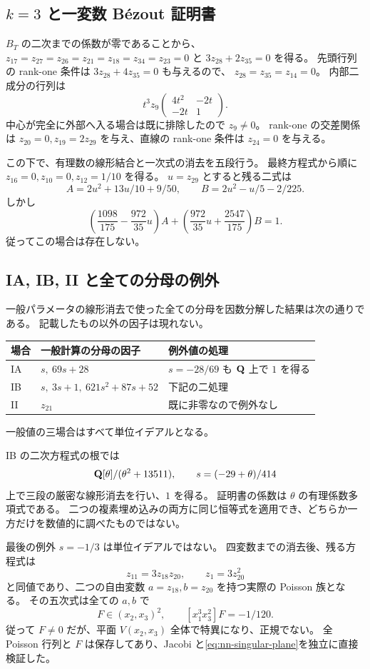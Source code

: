 \documentclass[11pt,a4paper]{ltjsarticle}
\theoremstyle{remark}\newtheorem{remark}[theorem]{注意}
\begin{document}
\subsection{\texorpdfstring{$k=3$}{k=3} と一変数 B\'ezout 証明書}
$B_T$ の二次までの係数が零であることから、
$z_{17}=z_{27}=z_{26}=z_{21}=z_{18}=z_{34}=z_{23}=0$ と $3z_{28}+2z_{35}=0$ を得る。
先頭行列の rank-one 条件は $3z_{28}+4z_{35}=0$ も与えるので、
$z_{28}=z_{35}=z_{14}=0$。
内部二成分の行列は
\[
 t^3z_9\begin{pmatrix}4t^2&-2t\\-2t&1\end{pmatrix}.
\]
中心が完全に外部へ入る場合は既に排除したので $z_9\ne0$。
rank-one の交差関係は $z_{20}=0,z_{19}=2z_{29}$ を与え、直線の rank-one 条件は
$z_{24}=0$ を与える。

この下で、有理数の線形結合と一次式の消去を五段行う。
最終方程式から順に $z_{16}=0,z_{10}=0,z_{12}=1/10$ を得る。
$u=z_{29}$ とすると残る二式は
\[
 A=2u^2+13u/10+9/50,\qquad
 B=2u^2-u/5-2/225.
\]
しかし
\[
 \left(\frac{1098}{175}-\frac{972}{35}u\right)A+
 \left(\frac{972}{35}u+\frac{2547}{175}\right)B=1.
\]
従ってこの場合は存在しない。

\subsection{IA, IB, II と全ての分母の例外}
一般パラメータの線形消去で使った全ての分母を因数分解した結果は次の通りである。
記載したもの以外の因子は現れない。

\begin{center}\small
\begin{tabular}{@{}lll@{}}\toprule
場合 & 一般計算の分母の因子 & 例外値の処理\\\midrule
IA & $s,\ 69s+28$ & $s=-28/69$ も $\mathbf Q$ 上で $1$ を得る\\
IB & $s,\ 3s+1,\ 621s^2+87s+52$ & 下記の二処理\\
II & $z_{21}$ & 既に非零なので例外なし\\\bottomrule
\end{tabular}\end{center}
一般値の三場合はすべて単位イデアルとなる。

IB の二次方程式の根では
\[
 \mathbf Q[\theta]/(\theta^2+13511),\qquad s=(-29+\theta)/414
\]
上で三段の厳密な線形消去を行い、$1$ を得る。
証明書の係数は $\theta$ の有理係数多項式である。
二つの複素埋め込みの両方に同じ恒等式を適用でき、どちらか一方だけを数値的に調べたものではない。

最後の例外 $s=-1/3$ は単位イデアルではない。
四変数までの消去後、残る方程式は
\[
 z_{11}=3z_{18}z_{20},\qquad z_1=3z_{20}^2
\]
と同値であり、二つの自由変数 $a=z_{18},b=z_{20}$ を持つ実際の Poisson 族となる。
その五次式は全ての $a,b$ で
\begin{equation}\label{eq:nn-singular-plane}
 F\in(x_2,x_3)^2,\qquad [x_1^3x_3^2]F=-1/120.
\end{equation}
従って $F\ne0$ だが、平面 $V(x_2,x_3)$ 全体で特異になり、正規でない。
全 Poisson 行列と $F$ は保存してあり、Jacobi と\eqref{eq:nn-singular-plane}を独立に直接検証した。
\end{document}

